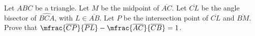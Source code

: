 Let $ABC$ be a triangle.
Let $M$ be the midpoint of $\overline{AC}$.
Let $\overline{CL}$ be the angle bisector of $\widehat{BCA}$,
with $L \in \overline{AB}$.
Let $P$ be the intersection point of $\overline{CL}$ and $\overline{BM}$.
Prove that
$\mfrac{\overline{CP}}{\overline{PL}}
 - \mfrac{\overline{AC}}{\overline{CB}}
 = 1$.

